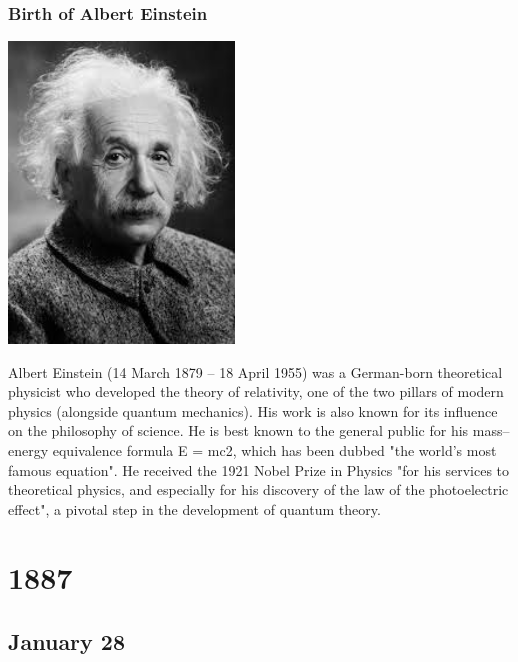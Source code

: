 \documentclass[11pt]{report}
\begin{document}
\subsection{Birth of Albert Einstein}
\vspace{2mm}\begin{center}\includegraphics[width=6cm]{./img/einstein.jpg}\end{center}
Albert Einstein (14 March 1879 – 18 April 1955) was a German-born theoretical physicist who developed the theory of relativity, one of the two pillars of modern physics (alongside quantum mechanics). His work is also known for its influence on the philosophy of science. He is best known to the general public for his mass–energy equivalence formula E = mc2, which has been dubbed "the world's most famous equation". He received the 1921 Nobel Prize in Physics "for his services to theoretical physics, and especially for his discovery of the law of the photoelectric effect", a pivotal step in the development of quantum theory.

\chapter{1887}
\section{January 28}
\end{document}
